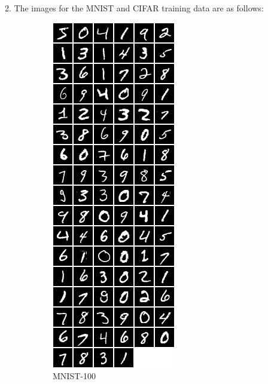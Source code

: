 \documentclass[11pt]{article}
\begin{document}
\maketitle

2. The images for the MNIST and CIFAR training data are as follows:
\begin{figure}[H]
\begin{subfigure}{.5\textwidth}
\centering
\includegraphics[scale=0.5]{torch/mnist100.png}
\caption{MNIST-100 \label{fig1}}
\end{subfigure}
\begin{subfigure}{.5\textwidth}
\centering

\end{subfigure}
\end{figure}
\end{document}
